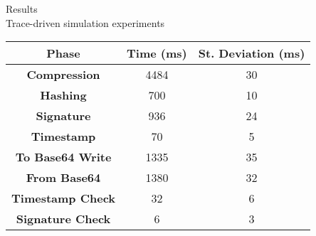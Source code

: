\begin{frame}{Results \\ \small Trace-driven simulation experiments}
\begin{tabular}{|c|c|c|}\hline
\textbf{Phase} & \textbf{Time} (ms) & \textbf{St. Deviation} (ms) \\ \hline
\textbf{Compression }& 4484 & 30 \\ \hline
\textbf{Hashing} & 700 & 10  \\ \hline
\textbf{Signature} & 936 & 24  \\ \hline
\textbf{Timestamp} & 70 & 5  \\ \hline
\textbf{To Base64 Write} & 1335 & 35  \\ \hline
\textbf{From Base64 }& 1380 & 32  \\ \hline
\textbf{Timestamp Check} & 32  & 6  \\ \hline
\textbf{Signature Check} & 6 & 3  \\ \hline
\end{tabular}
\end{frame}





